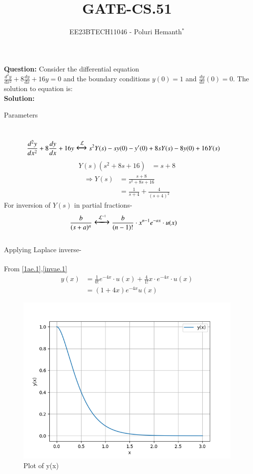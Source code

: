 \documentclass[journal,12pt,twocolumn]{IEEEtran}
\theoremstyle{remark}
\begin{document}

\vspace{3cm}

\title{GATE-CS.51}
\author{EE23BTECH11046 - Poluri Hemanth$^{*}$}
\maketitle
\textbf{Question:}
Consider the differential equation \\$\frac{d^2y}{dx^2}+8\frac{dy}{dx}+16y=0$ and the boundary conditions $y(0)=1$ and $\frac{dy}{dx}(0)=0$. The solution to equation is:\\
\textbf{Solution:}\\
\begin{table}[h!]
        
        \caption{Parameters}
        \label{tab:es.47}
\end{table}\\
\begin{align}
	\frac{d^2y}{dx^2}+8\frac{dy}{dx}+16y&\Large\xleftrightarrow{\mathcal{L}}s^2Y(s)-sy(0)-y'(0)+8sY(s)-8y(0)+16Y(s)
\end{align}
\begin{align}
	Y(s)(s^2+8s+16)&=s+8
\end{align}
\begin{align}
	\Rightarrow Y(s)&=\frac{s+8}{s^2+8s+16}\\
	&=\frac{1}{s+4}+\frac{4}{(s+4)^2}\label{1ae.1}
\end{align}
For inversion of $Y(s)$ in partial fractions-
\begin{align}
	&\frac{b}{(s+a)^n}\Large\xleftrightarrow{\mathcal{L}^{-1}}\frac{b}{(n-1)!}\cdot x^{n-1} e^{-ax}\cdot u(x)\label{invae.1}
\end{align}
\\
Applying Laplace inverse-\\
\\From \eqref{1ae.1},\eqref{invae.1}
\begin{align}
	y(x)&=\frac{1}{0!} e^{-4x}\cdot u(x)+\frac{4}{1!}x\cdot e^{-4x}\cdot u(x)\\
	&=(1+4x)e^{-4x}u(x)
\end{align}
\newpage
\begin{figure}[h!]
    \centering
    \includegraphics[width=1\linewidth]{figure.png}
        \caption{Plot of y(x)}
    \label{fig:enter-label}
\end{figure}
\end{document}
